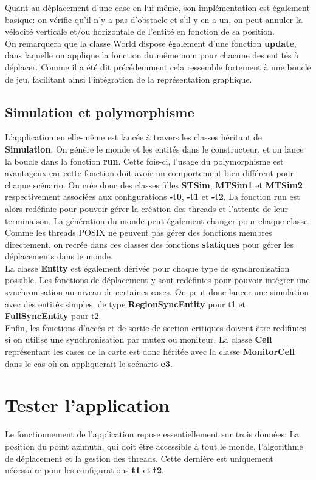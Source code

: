 \documentclass[11pt]{article} %
\begin{document}
Quant au déplacement d'une case en lui-même, son implémentation est également basique: on vérifie qu'il n'y a pas d'obstacle et s'il y en a un, on peut annuler la vélocité verticale et/ou horizontale de l'entité en fonction de sa position. \\
On remarquera que la classe World dispose également d'une fonction \textbf{update}, dans laquelle on applique la fonction du même nom pour chacune des entités à déplacer. Comme il a été dit précédemment cela ressemble fortement à une boucle de jeu, facilitant ainsi l'intégration de la représentation graphique.


\subsection{Simulation et polymorphisme}
L'application en elle-même est lancée à travers les classes héritant de \textbf{Simulation}. On génère le monde et les entités dans le constructeur, et on lance la boucle dans la fonction \textbf{run}. Cette fois-ci, l'usage du polymorphisme est avantageux car cette fonction doit avoir un comportement bien différent pour chaque scénario. On crée donc des classes filles \textbf{STSim},  \textbf{MTSim1} et \textbf{MTSim2} respectivement associées aux configurations \textbf{-t0}, \textbf{-t1} et \textbf{-t2}. La fonction run est alors redéfinie pour pouvoir gérer la création des threads et l'attente de leur terminaison. La génération du monde peut également changer pour chaque classe.
Comme les threads POSIX ne peuvent pas gérer des fonctions membres directement, on recrée dans ces classes des fonctions \textbf{statiques} pour gérer les déplacements dans le monde.  \\

La classe \textbf{Entity} est également dérivée pour chaque type de synchronisation possible. Les fonctions de déplacement y sont redéfinies pour pouvoir intégrer une synchronisation au niveau de certaines cases. On peut donc lancer une simulation avec des entités simples, de type \textbf{RegionSyncEntity} pour t1 et \textbf{FullSyncEntity} pour t2. \\

Enfin, les fonctions d'accés et de sortie de section critiques doivent être redifinies si on utilise une synchronisation par mutex ou moniteur. La classe \textbf{Cell} représentant les cases de la carte est donc héritée avec la classe \textbf{MonitorCell} dans le cas où on appliquerait le scénario \textbf{e3}.

\section{Tester l'application}
Le fonctionnement de l'application repose essentiellement sur trois données: La position du point azimuth, qui doit être accessible à tout le monde, l'algorithme de déplacement et la gestion des threads. Cette dernière est uniquement nécessaire pour les configurations \textbf{t1} et \textbf{t2}.
\end{document}
